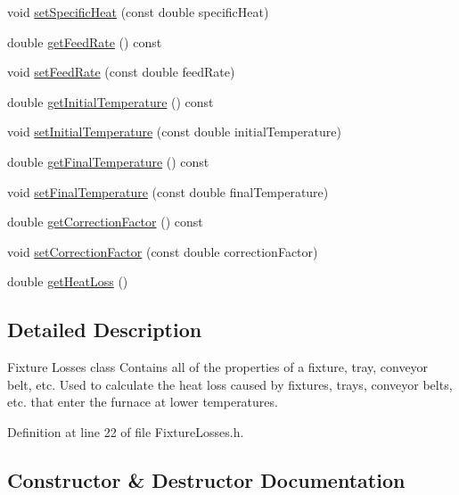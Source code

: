 \begin{DoxyCompactItemize}
\item 
void \hyperlink{class_fixture_losses_a946e4b6da1cca9f27e57f97688499ee1}{set\+Specific\+Heat} (const double specific\+Heat)
\item 
double \hyperlink{class_fixture_losses_a09707af8de4b304c65f4aeb1130ea44e}{get\+Feed\+Rate} () const
\item 
void \hyperlink{class_fixture_losses_a6543643db6b28f3a78397c97d9c5135f}{set\+Feed\+Rate} (const double feed\+Rate)
\item 
double \hyperlink{class_fixture_losses_aaa2e1042b71482b377e93d675909f78e}{get\+Initial\+Temperature} () const
\item 
void \hyperlink{class_fixture_losses_ad3f2a1013dc5da103f2bcfc1357a449b}{set\+Initial\+Temperature} (const double initial\+Temperature)
\item 
double \hyperlink{class_fixture_losses_a5c4259a78f78c675b063290f0fe6ea36}{get\+Final\+Temperature} () const
\item 
void \hyperlink{class_fixture_losses_a5b65e7118cb96c4f4c88c0d6d1a4f6d3}{set\+Final\+Temperature} (const double final\+Temperature)
\item 
double \hyperlink{class_fixture_losses_af643d715a8b1369efa586fa43e75c732}{get\+Correction\+Factor} () const
\item 
void \hyperlink{class_fixture_losses_a3a3dd839d71adb630e7ce76644f18098}{set\+Correction\+Factor} (const double correction\+Factor)
\item 
double \hyperlink{class_fixture_losses_a6829840bdf0607d52adaa9b5ee6ded75}{get\+Heat\+Loss} ()
\end{DoxyCompactItemize}


\subsection{Detailed Description}
Fixture Losses class Contains all of the properties of a fixture, tray, conveyor belt, etc. Used to calculate the heat loss caused by fixtures, trays, conveyor belts, etc. that enter the furnace at lower temperatures. 

Definition at line 22 of file Fixture\+Losses.\+h.



\subsection{Constructor \& Destructor Documentation}
\mbox{\label{class_fixture_losses_a97002e16f3f1be19983151cacec02f36}} 
